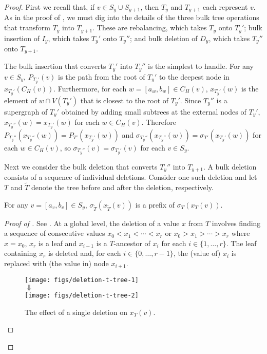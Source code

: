 \documentclass[kpfonts]{patmorin}
\begin{document}
\begin{proof}
  First we recall that, if $v\in S_y\cup S_{y+1}$, then $T_y$ and $T_{y+1}$ each represent $v$.  As in the proof of , we must dig into the details of the three bulk tree operations that transform $T_y$ into $T_{y+1}$. These are rebalancing, which takes $T_y$ onto $T_y'$; bulk insertion of $I_y$, which takes $T_y'$ onto $T_y''$; and bulk deletion of $D_y$, which takes $T_y''$ onto $T_{y+1}$.

  The bulk insertion that converts $T_y'$ into $T_y''$ is the simplest to handle.  For any $v\in S_y$, $P_{T_y'}(v)$ is the path from the root of $T_y'$ to the deepest node in $x_{T_y'}(C_H(v))$.  Furthermore, for each $w=[a_w,b_w]\in C_H(v)$, $x_{T_y'}(w)$ is the element of $w\cap V(T_y')$ that is closest to the root of $T_y'$. Since $T_y''$ is a supergraph of $T_y'$ obtained by adding small subtrees at the external nodes of $T_y'$, $x_{T_y''}(w)=x_{T_y'}(w)$ for each $w\in C_H(v)$.  Therefore $P_{T_y''}(x_{T_y''}(w))=P_{T'}(x_{T_y'}(w))$ and $\sigma_{T_y''}(x_{T_y''}(w))=\sigma_{T'}(x_{T_y'}(w))$ for each $w\in C_H(v)$, so $\sigma_{T_y''}(v)=\sigma_{T_y'}(v)$ for each $v\in S_y$.

  Next we consider the bulk deletion that converts $T_y''$ into $T_{y+1}$.  A bulk deletion consists of a sequence of individual deletions. Consider one such deletion and let $T$ and $\tilde{T}$ denote the tree before and after the deletion, respectively.

  \begin{clm}
    For any $v=[a_v,b_v]\in S_y$, $\sigma_{\tilde{T}}(x_{\tilde{T}}(v))$ is a prefix of $\sigma_T(x_T(v))$.
  \end{clm}

  \begin{proof}[Proof of ]
    See .  At a global level, the deletion of a value $x$ from $T$ involves finding a sequence of consecutive values $x_0<x_1<\cdots<x_r$ or $x_0>x_1>\cdots>x_r$ where $x=x_0$, $x_r$ is a leaf and $x_{i-1}$ is a $T$-ancestor of $x_{i}$ for each $i\in\{1,\ldots,r\}$.  The leaf containing $x_r$ is deleted and, for each $i\in\{0,\ldots,r-1\}$, the (value of) $x_i$ is replaced with (the value in) node $x_{i+1}$.

    \begin{figure}
      \begin{center}
        \texttt{[image: figs/deletion-t-tree-1]}\\[1ex]
        $\Downarrow$\\[1ex]
        \texttt{[image: figs/deletion-t-tree-2]}
      \end{center}
      \caption{The effect of a single deletion on $x_T(v)$.}
    \end{figure}


\end{proof}
\end{proof}
\end{document}
